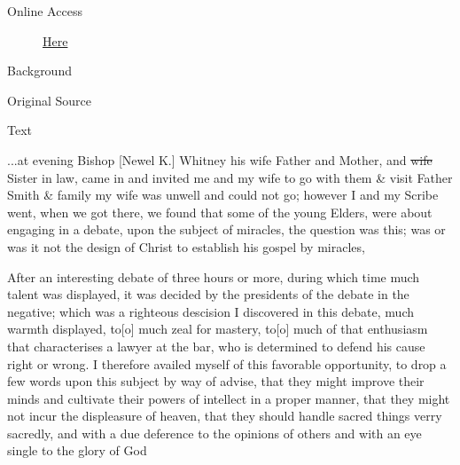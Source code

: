 			\begin{description}
				\item[Online Access] \href{https://www.josephsmithpapers.org/paper-summary/journal-1835-1836/47}{Here}
			\end{description}
			
			\begin{description}
				\item[Background]
			\end{description}
			
			
			\begin{description}
				\item[Original Source]
			\end{description}
			
			
			\begin{description}
				\item[Text]
			\end{description}
			
				...at evening Bishop [Newel K.] Whitney his wife Father and Mother, and \sout{wife} Sister in law, came in and invited me and my wife to go with them \& visit Father Smith \& family my wife was unwell and could not go; however I and my Scribe went, when we got there, we found that some of the young Elders, were about engaging in a debate, upon the subject of miracles, the question was this; was or was it not the design of Christ to establish his gospel by miracles,
				
				After an interesting debate of three hours or more, during which time much talent was displayed, it was decided by the presidents of the debate in the negative; which was a righteous descision I discovered in this debate, much warmth displayed, to[o] much zeal for mastery, to[o] much of that enthusiasm that characterises a lawyer at the bar, who is determined to defend his cause right or wrong. I therefore availed myself of this favorable opportunity, to drop a few words upon this subject by way of advise, that they might improve their minds and cultivate their powers of intellect in a proper manner, that they might not incur the displeasure of heaven, that they should handle sacred things verry sacredly, and with a due deference to the opinions of others and with an eye single to the glory of God
				
